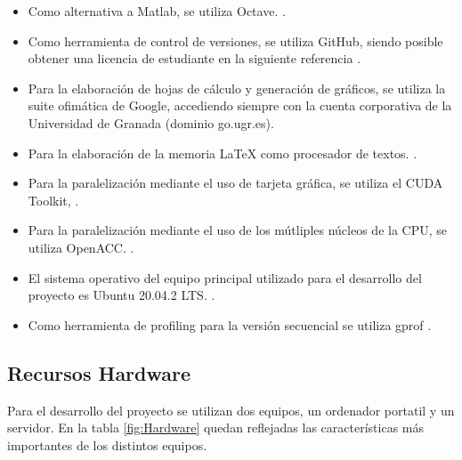 \begin{itemize}
    \item Como alternativa a Matlab, se utiliza Octave. \cite{unknown-author-2021B}.
    \item Como herramienta de control de versiones, se utiliza GitHub, siendo posible obtener una licencia de estudiante en la siguiente referencia \cite{unknown-author-2021}.
    \item Para la elaboración de hojas de cálculo y generación de gráficos, se utiliza la suite ofimática de Google, accediendo siempre con la cuenta corporativa de la Universidad de Granada (dominio go.ugr.es).
    \item Para la elaboración de la memoria LaTeX como procesador de textos. \cite{unknown-author-no-dateD}.
    \item Para la paralelización mediante el uso de tarjeta gráfica, se utiliza el CUDA Toolkit, \cite{unknown-author-2021F}.
    \item Para la paralelización mediante el uso de los mútliples núcleos de la CPU, se utiliza OpenACC. \cite{unknown-author-no-dateB}.
    \item El sistema operativo del equipo principal utilizado para el desarrollo del proyecto es Ubuntu 20.04.2 LTS. \cite{unknown-author-no-dateE}.
    \item Como herramienta de profiling para la versión secuencial se utiliza gprof \cite{unknown-author-no-dateI}.
\end{itemize}

\subsection{Recursos Hardware}
\label{RecursosHardware}
Para el desarrollo del proyecto se utilizan dos equipos, un ordenador portatil y un servidor. En la tabla \ref{fig:Hardware} quedan reflejadas las características más importantes de los distintos equipos.

